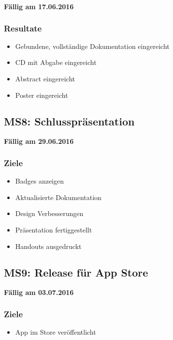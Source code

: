 \textbf{Fällig am 17.06.2016}

\subsubsection{Resultate}

\begin{itemize}
	\item Gebundene, vollständige Dokumentation eingereicht
	\item CD mit Abgabe eingereicht
	\item Abstract eingereicht
	\item Poster eingereicht
\end{itemize}


\subsection{MS8: Schlusspräsentation}
\label{pm-ms8}

\textbf{Fällig am 29.06.2016}

\subsubsection{Ziele}

\begin{itemize}
	\item Badges anzeigen
	\item Aktualisierte Dokumentation
	\item Design Verbesserungen
	\item Präsentation fertiggestellt
	\item Handouts ausgedruckt
\end{itemize}

\subsection{MS9: Release für App Store}
\label{pm-ms9}


\textbf{Fällig am 03.07.2016}

\subsubsection{Ziele}

\begin{itemize}
	\item {} App im  Store veröffentlicht
\end{itemize}
